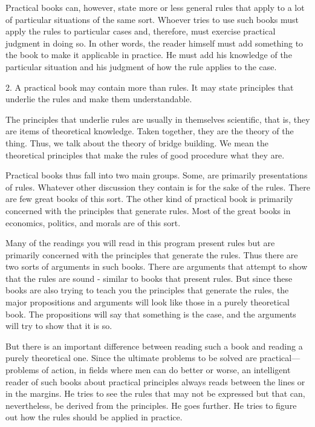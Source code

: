 \begin{displayquote}
Practical books can, however, state more or less general rules that apply to a lot of particular situations of the same sort. Whoever tries to use such books must apply the rules to particular cases and, therefore, must exercise practical judgment in doing so. In other words, the reader himself must add something to the book to make it applicable in practice. He must add his knowledge of the particular situation and his judgment of how the rule applies to the case.
\end{displayquote}

2. A practical book may contain more than rules. It may state principles that underlie the rules and make them understandable. 

\begin{displayquote}
The principles that underlie rules are usually in themselves scientific, that is, they are items of theoretical knowledge. Taken together, they are the theory of the thing. Thus, we talk about the theory of bridge building. We mean the theoretical principles that make the rules of good procedure what they are.

Practical books thus fall into two main groups. Some, are primarily presentations of rules. Whatever other discussion they contain is for the sake of the rules. There are few great books of this sort. The other kind of practical book is primarily concerned with the principles that generate rules. Most of the great books in economics, politics, and morals are of this sort.
\end{displayquote}

Many of the readings you will read in this program present rules but are primarily concerned with the principles that generate the rules. Thus there are two sorts of arguments in such books. There are arguments that attempt to show that the rules are sound - similar to books that present rules. But since these books are also trying to teach you the principles that generate the rules, the major propositions and arguments will look like those in a purely theoretical book. The propositions will say that something is the case, and the arguments will try to show that it is so.
\begin{displayquote}
But there is an important difference between reading such a book and reading a purely theoretical one. Since the ultimate problems to be solved are practical—problems of action, in fields where men can do better or worse, an intelligent reader of such books about practical principles always reads between the lines or in the margins. He tries to see the rules that may not be expressed but that can, nevertheless, be derived from the principles. He goes further. He tries to figure out how the rules should be applied in practice.
\end{displayquote}

